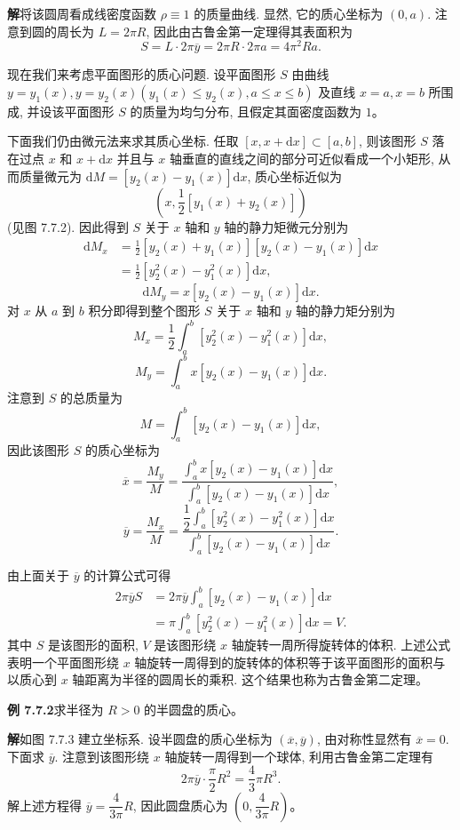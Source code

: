 \documentclass[UTF8,12pt,a4paper,fontset=fandol]{ctexart}
\begin{document}
\noindent\textbf{解}\quad 将该圆周看成线密度函数 $\rho\equiv1$ 的质量曲线. 显然, 它的质心坐标为 $(0,a)$. 注意到圆的周长为 $L=2\pi R$, 因此由古鲁金第一定理得其表面积为
\[
  S=L\cdot2\pi\overline y=2\pi R\cdot2\pi a=4\pi^2Ra.
\]

现在我们来考虑平面图形的质心问题. 设平面图形 $S$ 由曲线 $y=y_1(x),y=y_2(x)(y_1(x)\leq y_2(x),a\leq x\leq b)$ 及直线 $x=a,x=b$ 所围成, 并设该平面图形 $S$ 的质量为均匀分布, 且假定其面密度函数为 $1$。

下面我们仍由微元法来求其质心坐标. 任取 $[x,x+\mathrm dx]\subset[a,b]$, 则该图形 $S$ 落在过点 $x$ 和 $x+\mathrm dx$ 并且与 $x$ 轴垂直的直线之间的部分可近似看成一个小矩形, 从而质量微元为 $\mathrm dM=[y_2(x)-y_1(x)]\mathrm dx$, 质心坐标近似为
\[
  \left(x,\frac{1}{2}[y_1(x)+y_2(x)]\right)
\]
(见图 7.7.2). 因此得到 $S$ 关于 $x$ 轴和 $y$ 轴的静力矩微元分别为
\[
\begin{aligned}
  \mathrm dM_x
  &=\frac{1}{2}[y_2(x)+y_1(x)][y_2(x)-y_1(x)]\mathrm dx\\
  &=\frac{1}{2}[y_2^2(x)-y_1^2(x)]\mathrm dx,
\end{aligned}
\]
\[
  \mathrm dM_y=x[y_2(x)-y_1(x)]\mathrm dx.
\]
对 $x$ 从 $a$ 到 $b$ 积分即得到整个图形 $S$ 关于 $x$ 轴和 $y$ 轴的静力矩分别为
\[
  M_x=\frac{1}{2}\int_a^b [y_2^2(x)-y_1^2(x)]\mathrm dx,
\]
\[
  M_y=\int_a^b x[y_2(x)-y_1(x)]\mathrm dx.
\]
注意到 $S$ 的总质量为
\[
  M=\int_a^b [y_2(x)-y_1(x)]\mathrm dx,
\]
因此该图形 $S$ 的质心坐标为
\[
  \overline x=\frac{M_y}{M}
  =\frac{\int_a^b x[y_2(x)-y_1(x)]\mathrm dx}
  {\int_a^b [y_2(x)-y_1(x)]\mathrm dx},
\]
\[
  \overline y=\frac{M_x}{M}
  =\frac{\dfrac{1}{2}\int_a^b [y_2^2(x)-y_1^2(x)]\mathrm dx}
  {\int_a^b [y_2(x)-y_1(x)]\mathrm dx}.
\]

由上面关于 $\overline y$ 的计算公式可得
\[
\begin{aligned}
  2\pi\overline yS
  &=2\pi\overline y\int_a^b [y_2(x)-y_1(x)]\mathrm dx\\
  &=\pi\int_a^b [y_2^2(x)-y_1^2(x)]\mathrm dx=V.
\end{aligned}
\]
其中 $S$ 是该图形的面积, $V$ 是该图形绕 $x$ 轴旋转一周所得旋转体的体积. 上述公式表明一个平面图形绕 $x$ 轴旋转一周得到的旋转体的体积等于该平面图形的面积与以质心到 $x$ 轴距离为半径的圆周长的乘积. 这个结果也称为古鲁金第二定理。

\noindent\textbf{例 7.7.2}\quad 求半径为 $R>0$ 的半圆盘的质心。

\noindent\textbf{解}\quad 如图 7.7.3 建立坐标系. 设半圆盘的质心坐标为 $(\overline x,\overline y)$, 由对称性显然有 $\overline x=0$. 下面求 $\overline y$. 注意到该图形绕 $x$ 轴旋转一周得到一个球体, 利用古鲁金第二定理有
\[
  2\pi\overline y\cdot\frac{\pi}{2}R^2=\frac{4}{3}\pi R^3.
\]
解上述方程得 $\overline y=\dfrac{4}{3\pi}R$, 因此圆盘质心为 $\left(0,\dfrac{4}{3\pi}R\right)$。
\end{document}
